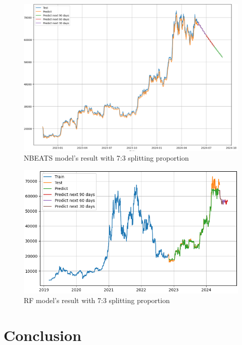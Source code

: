 \documentclass{ieeeojies}
\begin{document}
\begin{figure}[H]
	\centering
	\begin{minipage}{0.6\linewidth}
		\centering
		\includegraphics[width=\linewidth]{bibliography/Images/NBEATS_BTC_73.PNG}
		\caption{NBEATS model's result with 7:3 splitting proportion}
	\end{minipage}
\end{figure}
\begin{figure}[H]
	\centering
	\begin{minipage}{0.6\linewidth}
		\centering
		\includegraphics[width=\linewidth]{bibliography/Images/RF_BTC_73.PNG}
		\caption{RF model's result with 7:3 splitting proportion}
	\end{minipage}
\end{figure}


\section{Conclusion}
\end{document}
